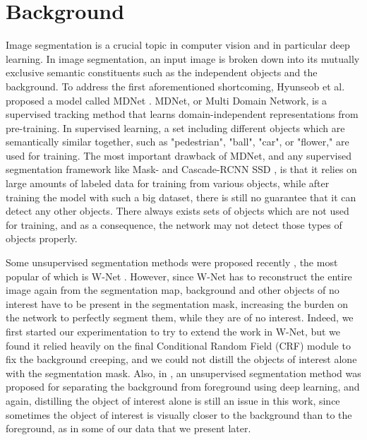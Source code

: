 \documentclass[./dissertation.tex]{subfiles}
\begin{document}
\label{Background}
\section{Background}

Image segmentation is a crucial topic in computer vision and in particular deep learning. In image segmentation, an input image is broken down into its mutually exclusive semantic constituents such as the independent objects and the background. To address the first aforementioned shortcoming, Hyunseob et al. proposed a model called MDNet \cite{nam2016learning}. MDNet, or Multi Domain Network, is a supervised tracking method that learns domain-independent representations from pre-training. In supervised learning, a set including different objects which are semantically similar together, such as "pedestrian", "ball", "car", or "flower," are used for training. The most important drawback of MDNet, and any supervised segmentation framework like Mask- and Cascade-RCNN \cite{he2018maskrcnn,cai2018cascade} SSD \cite{liu2016ssd}, is that it relies on large amounts of labeled data for training from various objects, while after training the model with such a big dataset, there is still no guarantee that it can detect any other objects. There always exists sets of objects which are not used for training, and as a consequence, the network may not detect those types of objects properly.

Some unsupervised segmentation methods were proposed recently \cite{croitoru2019unsupervised,ji2019invariant,liu2014mslrr,xia2017w}, the most popular of which is W-Net \cite{xia2017w}. However, since W-Net has to reconstruct the entire image again from the segmentation map, background and other objects of no interest have to be present in the segmentation mask, increasing the burden on the network to perfectly segment them, while they are of no interest. Indeed, we first started our experimentation to try to extend the work in W-Net, but we found it relied heavily on the final Conditional Random Field (CRF) module to fix the background creeping, and we could not distill the objects of interest alone with the segmentation mask. Also, in \cite{croitoru2019unsupervised}, an unsupervised segmentation method was proposed for separating the background from foreground using deep learning, and again, distilling the object of interest alone is still an issue in this work, since sometimes the object of interest is visually closer to the background than to the foreground, as in some of our data that we present later.
\end{document}
